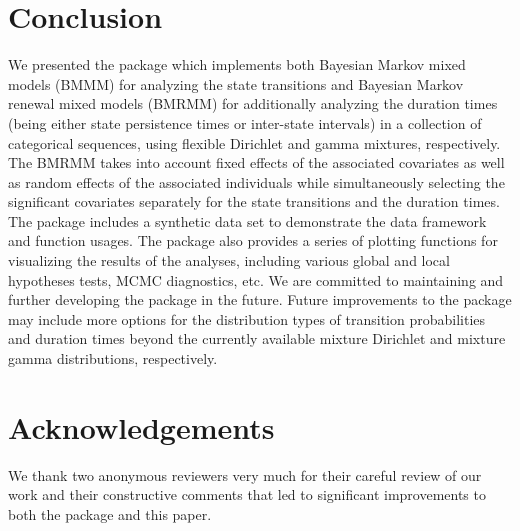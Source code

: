 \section{Conclusion} \label{sec:end}

We presented the  package which implements 
both Bayesian Markov mixed models (BMMM) for analyzing the state transitions 
and Bayesian Markov renewal mixed models (BMRMM) for additionally analyzing the duration times (being either state persistence times or inter-state intervals)
in a collection of categorical sequences, 
using flexible Dirichlet and gamma mixtures, respectively. 
The BMRMM takes into account fixed effects of the associated covariates as well as random effects of the associated individuals while
simultaneously selecting the significant covariates separately for the state transitions and the {duration times}. 
{The package includes a synthetic  data set to demonstrate the data framework and function usages.} 
The package also provides a series of plotting functions for visualizing the results of the analyses, 
including various global and local hypotheses tests, MCMC diagnostics, etc. 
We are committed to maintaining and further developing the package in the future. 
Future improvements to the package may include more options for the distribution types of transition probabilities and duration times beyond the currently available mixture Dirichlet and mixture gamma distributions, respectively.  



\section{Acknowledgements} \label{sec:ack}
We thank two anonymous reviewers very much for their careful review of our work 
and their constructive comments that led to significant improvements to both the package and this paper. 






\address{Yutong Wu\\
  Department of Mechanical Engineering\\
  The University of Texas at Austin\\
  204 E Dean Keeton St C2200, Austin, TX 78712-1591\\
 United States\\
  ORCID: 0000-0001-7828-9981\\
  }

\address{Abhra Sarkar\\
   Department of Statistics and Data Sciences\\
  The University of Texas at Austin\\
  2317 Speedway D9800, Austin, TX 78712-1823\\
  United States\\
  ORCID: 0000-0002-6924-8464\\
  }

